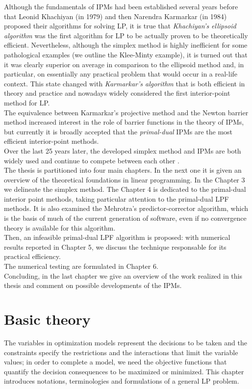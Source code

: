 \documentclass[a4paper,10 pt,titlepage,twoside]{book}
\theoremstyle{plain}
\theoremstyle{definition}
\theoremstyle{remark}
\begin{document}
Although the fundamentals of IPMs had been established several years before that Leonid Khachiyan (in 1979) and then Narendra Karmarkar (in 1984) proposed their algorithms for solving LP, it is true that \textit{Khachiyan’s ellipsoid algorithm} was the first algorithm for LP to be actually proven to be theoretically efficient. Nevertheless, although the simplex method is highly inefficient for some pathological examples (we outline the Klee-Minty example), it is turned out that it was clearly superior on average in comparison to the ellipsoid method and, in particular, on essentially any practical problem that would occur in a real-life context. This state changed with \textit{Karmarkar’s algorithm} that is both efficient in theory and practice and nowadays widely considered the first interior-point method for LP.\\
The equivalence between Karmarkar's projective method and the Newton barrier method increased interest in the role of barrier functions in the theory of IPMs, but currently it is broadly accepted that the \textit{primal-dual} IPMs are the most efficient interior-point methods.\\
\newpage
Over the last 25 years later, the developed simplex method and IPMs are both widely used and continue to compete between each other \cite{25y}. \\
The thesis is partitioned into four main chapters.
In the next one it is given an overview of the theoretical foundations in linear programming. In the Chapter 3 we delineate the simplex method. The Chapter 4 is dedicated to the primal-dual interior point methods, taking particular attention to the primal-dual LPF methods. It is also examined the Mehrotra's predictor-corrector algorithm, which is the basis of much of the current generation of software, even if no convergence theory is available for this algorithm.\\
Then, an infeasible primal-dual LPF algorithm is proposed: with numerical results reported in Chapter 5, we discuss the technique responsable for its practical efficiency.\\
The numerical testing are formulated in Chapter 6.\\
Concluding, in the last chapter we give an overview of the work realized in this thesis and comment on possible developments of the IPMs. 

%
%

\chapter{Basic theory}
The variables in optimization models represent the decisions to be taken and the constraints specify the restrictions and the interactions that limit the variable values; in order to complete a model, we need the objective functions that quantify the decision consequences to be maximized or minimized. This chapter introduces notations, terminologies and formulations of a general LP problem.
\end{document}
